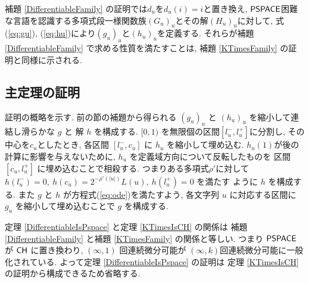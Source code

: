  補題 \ref{DifferentiableFamily} の証明では$d_u$を$d_u(i) = i$と置き換え,
 $\mathsf{PSPACE}$困難な言語を認識する多項式段一様関数族$(G_u)_u$とその解$(H_u)_u$に対して,
 式(\ref{eq:gu}), (\ref{eq:hu})により$(g_u)_u$と$(h_u)_u$を定義する.
 それらが補題 \ref{DifferentiableFamily} で求める性質を満たすことは,
 補題 \ref{KTimesFamily} の証明と同様に示される.


\subsection{主定理の証明}
\label{subsection: proof of theorems}

 証明の概略を示す.
 前の節の補題から得られる $(g_u)_u$ と $(h_u)_u$ を縮小して連結し滑らかな $g$ と
 解 $h$ を構成する.
 $[0,1)$ を無限個の区間$[l^-_u, l^+_u]$に分割し, 
 その中心を$c_u$としたとき, 各区間 $[l^-_u, c_u]$ に $h_u$ を縮小して埋め込む. 
 $h_u(1)$が後の計算に影響を与えないために,
 $h_u$ を定義域方向について反転したものを
 区間 $[c_u, l^+_u]$ に埋め込むことで相殺する.
 つまりある多項式$\rho'$に対して
 $h(l^-_u) = 0,\ h(c_u) = 2^{-\rho'(|u|)} L(u),\ h(l^+_u) = 0$ を満たす
 ように $h$ を構成する.
 また $g$ と $h$ が方程式(\ref{eq:ode})を満たすよう,
 各文字列 $u$ に対応する区間に $g_u$ を縮小して埋め込むことで $g$ を構成する.

 定理 \ref{DifferentiableIsPspace} と定理 \ref{KTimesIsCH} の関係は
 補題 \ref{DifferentiableFamily} と補題 \ref{KTimesFamily} の関係と等しい.
 つまり $\mathsf{PSPACE}$ が $\mathsf{CH}$ に置き換わり,
 $(\infty, 1)$ 回連続微分可能が $(\infty, k)$回連続微分可能に一般化されている.
 よって定理 \ref{DifferentiableIsPspace} の証明は
 定理 \ref{KTimesIsCH} の証明から構成できるため省略する.



